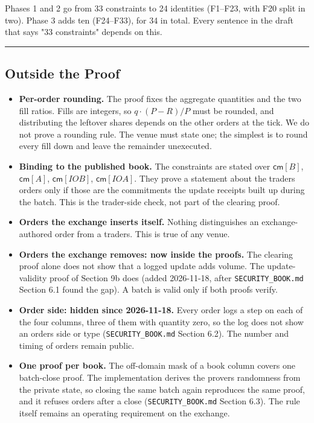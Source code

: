 Phases 1 and 2 go from 33 constraints to 24 identities (F1--F23, with F20 split in two). Phase 3 adds ten (F24--F33), for 34 in total. Every sentence in the draft that says "33 constraints" depends on this.

\begin{center}\rule{0.5\linewidth}{0.5pt}\end{center}

\subsection{Outside the Proof}

\begin{itemize}
\item
  \textbf{Per-order rounding.} The proof fixes the aggregate quantities and the two fill ratios. Fills are integers, so \(q \cdot (P-R)/P\) must be rounded, and distributing the leftover shares depends on the other orders at the tick. We do not prove a rounding rule. The venue must state one; the simplest is to round every fill down and leave the remainder unexecuted.
\item
  \textbf{Binding to the published book.} The constraints are stated over \(\mathsf{cm}[B]\), \(\mathsf{cm}[A]\), \(\mathsf{cm}[IOB]\), \(\mathsf{cm}[IOA]\). They prove a statement about the traders\textquotesingle{} orders only if those are the commitments the update receipts built up during the batch. This is the trader-side check, not part of the clearing proof.
\item
  \textbf{Orders the exchange inserts itself.} Nothing distinguishes an exchange-authored order from a trader\textquotesingle s. This is true of any venue.
\item
  \textbf{Orders the exchange removes: now inside the proofs.} The clearing proof alone does not show that a logged update adds volume. The update-validity proof of Section 9b does (added 2026-11-18, after \texttt{SECURITY\_BOOK.md} Section 6.1 found the gap). A batch is valid only if both proofs verify.
\item
  \textbf{Order side: hidden since 2026-11-18.} Every order logs a step on each of the four columns, three of them with quantity zero, so the log does not show an order\textquotesingle s side or type (\texttt{SECURITY\_BOOK.md} Section 6.2). The number and timing of orders remain public.
\item
  \textbf{One proof per book.} The off-domain mask of a book column covers one batch-close proof. The implementation derives the prover\textquotesingle s randomness from the private state, so closing the same batch again reproduces the same proof, and it refuses orders after a close (\texttt{SECURITY\_BOOK.md} Section 6.3). The rule itself remains an operating requirement on the exchange.
\end{itemize}

